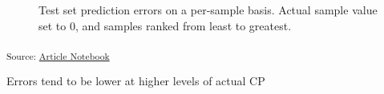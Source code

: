 \documentclass[
]{agujournal2019}
\begin{document}
\label{cell-fig-validation_set_performance}
\begin{figure}[H]


\caption{\label{fig-validation_set_performance}Test set prediction
errors on a per-sample basis. Actual sample value set to 0, and samples
ranked from least to greatest.}

\end{figure}%

\textsubscript{Source:
\href{https://rvcrawford.github.io/glowing-system/index-preview.html}{Article
Notebook}}

Errors tend to be lower at higher levels of actual CP
\end{document}
